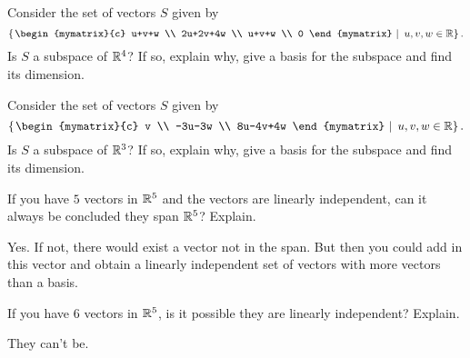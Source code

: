 \begin{enumialphparenastyle}
\begin{ex}
  Consider the set of vectors $S$ given by  
  \begin{equation*}
    \set{\left.\begin{mymatrix}{c}
        u+v+w \\ 
        2u+2v+4w \\ 
        u+v+w \\ 
        0
      \end{mymatrix} ~\right\vert~u,v,w\in \R} .
  \end{equation*}
  Is $S$ a subspace of $\mathbb{R}^{4}$? If so, explain why,
  give a basis for the subspace and find its dimension.
\end{ex}

\begin{ex}
  Consider the set of vectors $S$ given by  
  \begin{equation*}
    \set{\left.\begin{mymatrix}{c}
        v \\ 
        -3u-3w \\ 
        8u-4v+4w
      \end{mymatrix} ~\right\vert~u,v,w\in \R} .
  \end{equation*}
  Is $S$ a subspace of $\mathbb{R}^{3}$? If so, explain why,
  give a basis for the subspace and find its dimension.
\end{ex}

\begin{ex}
  If you have $5$ vectors in $\mathbb{R}^{5}$ and the vectors are
  linearly independent, can it always be concluded they span $\mathbb{R}^{5}$?
  Explain. 
  \begin{sol}
    Yes. If not, there would exist a vector not in the span. But then
    you could add in this vector and obtain a linearly independent set of
    vectors with more vectors than a basis.
  \end{sol}
\end{ex}

\begin{ex}
  If you have $6$ vectors in $\mathbb{R}^{5}$, is it possible they are
  linearly independent? Explain.
  \begin{sol}
    They can't be.
  \end{sol}
\end{ex}



\end{enumialphparenastyle}

